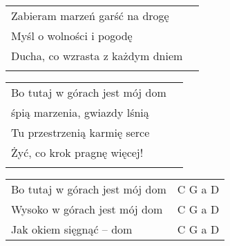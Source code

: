 \documentclass[a5paper]{article}
\begin{document}
\noindent
\begin{tabular}{@{}p{7.50cm}p{3cm}@{}}
Zabieram marzeń garść na drogę \\
Myśl o wolności i pogodę \\
Ducha, co wzrasta z każdym dniem \\ \\
\end{tabular} 

\noindent
\begin{tabular}{@{}p{6.50cm}p{3cm}@{}}
Bo tutaj w górach jest mój dom \\
śpią marzenia, gwiazdy lśnią \\
Tu przestrzenią karmię serce \\
Żyć, co krok pragnę więcej! \\ \\
\end{tabular} 

\noindent
\begin{tabular}{@{}p{8.50cm}p{3cm}@{}}
Bo tutaj w górach jest mój dom & C G a D \\
Wysoko w górach jest mój dom & C G a D \\
Jak okiem sięgnąć – dom & C G a D
\end{tabular} 
\end{document}
